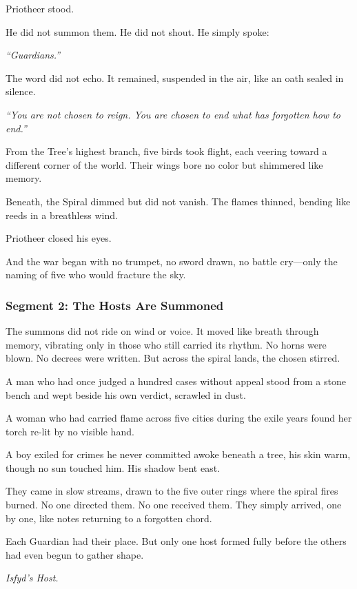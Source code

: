 \documentclass[9pt]{article}
\begin{document}
Priotheer stood.

He did not summon them. He did not shout. He simply spoke:

\emph{``Guardians.''}

The word did not echo. It remained, suspended in the air, like an oath sealed in silence.

\emph{``You are not chosen to reign. You are chosen to end what has forgotten how to end.''}

From the Tree’s highest branch, five birds took flight, each veering toward a different corner of the world. Their wings bore no color but shimmered like memory.

Beneath, the Spiral dimmed but did not vanish. The flames thinned, bending like reeds in a breathless wind.

Priotheer closed his eyes.

And the war began with no trumpet, no sword drawn, no battle cry—only the naming of five who would fracture the sky.


\newpage

\subsubsection*{Segment 2: The Hosts Are Summoned}

The summons did not ride on wind or voice. It moved like breath through memory, vibrating only in those who still carried its rhythm. No horns were blown. No decrees were written. But across the spiral lands, the chosen stirred.

A man who had once judged a hundred cases without appeal stood from a stone bench and wept beside his own verdict, scrawled in dust.

A woman who had carried flame across five cities during the exile years found her torch re-lit by no visible hand.

A boy exiled for crimes he never committed awoke beneath a tree, his skin warm, though no sun touched him. His shadow bent east.

They came in slow streams, drawn to the five outer rings where the spiral fires burned. No one directed them. No one received them. They simply arrived, one by one, like notes returning to a forgotten chord.

Each Guardian had their place. But only one host formed fully before the others had even begun to gather shape.

\textit{Isfyd’s Host.}
\end{document}
